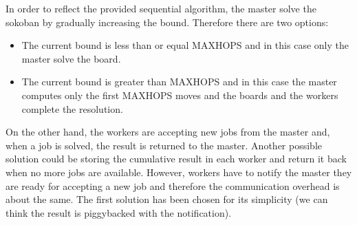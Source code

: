 \documentclass{article}
\begin{document}
In order to reflect the provided sequential algorithm, the master solve the sokoban by gradually increasing the bound. Therefore there are two options:
\begin{itemize}
    \item The current bound is less than or equal MAXHOPS and in this case only the master solve the board.
    \item The current bound is greater than MAXHOPS and in this case the master computes only the first MAXHOPS moves and the boards and the workers complete the resolution.
\end{itemize}
On the other hand, the workers are accepting new jobs from the master and, when a job is solved, the result is returned to the master. Another possible solution could be storing the cumulative result in each worker and return it back when no more jobs are available. However, workers have to notify the master they are ready for accepting a new job and therefore the communication overhead is about the same. The first solution has been chosen for its simplicity (we can think the result is piggybacked with the notification). \\
\end{document}
